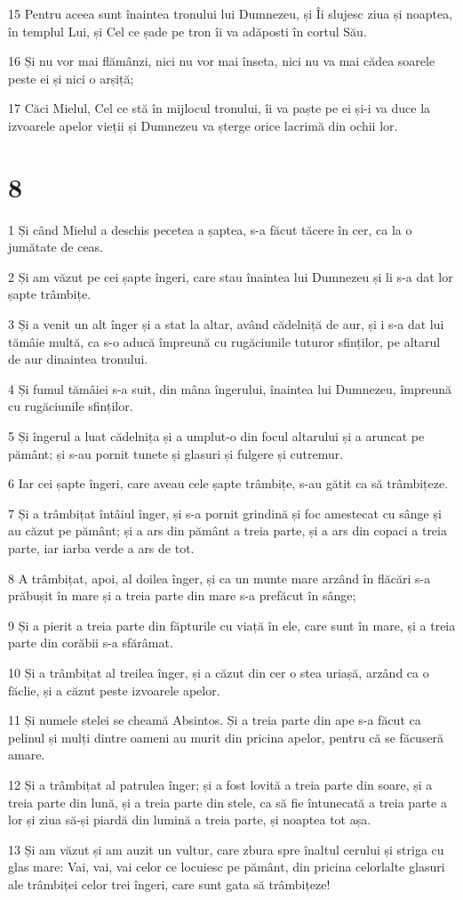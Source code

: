 \par 15 Pentru aceea sunt înaintea tronului lui Dumnezeu, și Îi slujesc ziua și noaptea, în templul Lui, și Cel ce șade pe tron îi va adăposti în cortul Său.
\par 16 Și nu vor mai flămânzi, nici nu vor mai înseta, nici nu va mai cădea soarele peste ei și nici o arșiță;
\par 17 Căci Mielul, Cel ce stă în mijlocul tronului, îi va paște pe ei și-i va duce la izvoarele apelor vieții și Dumnezeu va șterge orice lacrimă din ochii lor.

\chapter{8}

\par 1 Și când Mielul a deschis pecetea a șaptea, s-a făcut tăcere în cer, ca la o jumătate de ceas.
\par 2 Și am văzut pe cei șapte îngeri, care stau înaintea lui Dumnezeu și li s-a dat lor șapte trâmbițe.
\par 3 Și a venit un alt înger și a stat la altar, având cădelniță de aur, și i s-a dat lui tămâie multă, ca s-o aducă împreună cu rugăciunile tuturor sfinților, pe altarul de aur dinaintea tronului.
\par 4 Și fumul tămâiei s-a suit, din mâna îngerului, înaintea lui Dumnezeu, împreună cu rugăciunile sfinților.
\par 5 Și îngerul a luat cădelnița și a umplut-o din focul altarului și a aruncat pe pământ; și s-au pornit tunete și glasuri și fulgere și cutremur.
\par 6 Iar cei șapte îngeri, care aveau cele șapte trâmbițe, s-au gătit ca să trâmbițeze.
\par 7 Și a trâmbițat întâiul înger, și s-a pornit grindină și foc amestecat cu sânge și au căzut pe pământ; și a ars din pământ a treia parte, și a ars din copaci a treia parte, iar iarba verde a ars de tot.
\par 8 A trâmbițat, apoi, al doilea înger, și ca un munte mare arzând în flăcări s-a prăbușit în mare și a treia parte din mare s-a prefăcut în sânge;
\par 9 Și a pierit a treia parte din făpturile cu viață în ele, care sunt în mare, și a treia parte din corăbii s-a sfărâmat.
\par 10 Și a trâmbițat al treilea înger, și a căzut din cer o stea uriașă, arzând ca o făclie, și a căzut peste izvoarele apelor.
\par 11 Și numele stelei se cheamă Absintos. Și a treia parte din ape s-a făcut ca pelinul și mulți dintre oameni au murit din pricina apelor, pentru că se făcuseră amare.
\par 12 Și a trâmbițat al patrulea înger; și a fost lovită a treia parte din soare, și a treia parte din lună, și a treia parte din stele, ca să fie întunecată a treia parte a lor și ziua să-și piardă din lumină a treia parte, și noaptea tot așa.
\par 13 Și am văzut și am auzit un vultur, care zbura spre înaltul cerului și striga cu glas mare: Vai, vai, vai celor ce locuiesc pe pământ, din pricina celorlalte glasuri ale trâmbiței celor trei îngeri, care sunt gata să trâmbițeze!

